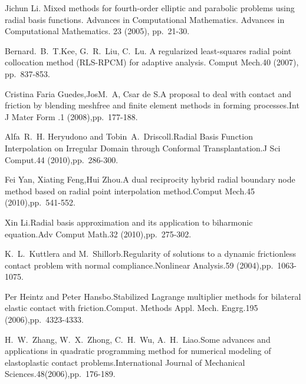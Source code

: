
\begin{thebibliography}{10}

{\sc Jichun Li}. {Mixed methods for fourth-order elliptic and parabolic problems using radial basis functions. Advances in Computational Mathematics}. Advances in Computational Mathematics. 23 (2005), pp.~21-30.

{\sc Bernard.~B.~T.Kee, G.~R.~Liu, C.~Lu}. {A regularized least-squares radial point collocation method (RLS-RPCM) for adaptive analysis}. Comput Mech.40 (2007), pp.~837-853.

{\sc Cristina Faria Guedes,JosM.~A, Csar de S}.{A proposal to deal with contact and friction by blending meshfree and finite element methods in forming processes}.Int J Mater Form .1 (2008),pp.~177-188.

{\sc Alfa~R.~H. Heryudono and Tobin~A.~Driscoll}.{Radial Basis Function Interpolation on Irregular Domain through Conformal Transplantation}.J Sci Comput.44 (2010),pp.~286-300.

{\sc Fei Yan, Xiating Feng,Hui Zhou}.{A dual reciprocity hybrid radial boundary node method based on radial point interpolation method}.Comput Mech.45 (2010),pp.~541-552.

{\sc Xin Li}.{Radial basis approximation and its application to biharmonic equation}.Adv Comput Math.32 (2010),pp.~275-302.

{\sc K.~L.~Kuttlera and M.~Shillorb}.{Regularity of solutions to a dynamic frictionless contact problem with normal compliance}.Nonlinear Analysis.59 (2004),pp.~1063-1075.

{\sc Per Heintz and Peter Hansbo}.{Stabilized Lagrange multiplier methods for bilateral elastic contact with friction}.Comput. Methods Appl. Mech. Engrg.195 (2006),pp.~4323-4333.

{\sc H.~W.~Zhang, W.~X.~Zhong, C.~H.~Wu, A.~H.~Liao}.{Some advances and applications in quadratic programming method for numerical modeling of elastoplastic contact problems}.International Journal of Mechanical Sciences.48(2006),pp.~176-189.

\end{thebibliography}